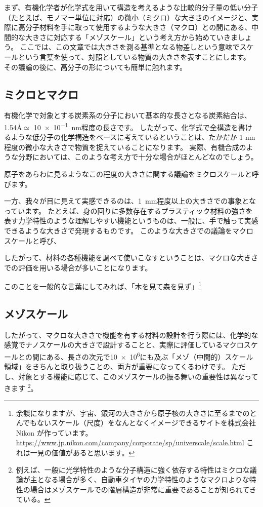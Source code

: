 \documentclass[a4paper,11pt]{ltjsarticle}
\begin{document}
まず、有機化学者が化学式を用いて構造を考えるような比較的分子量の低い分子（たとえば、モノマー単位に対応）の微小（ミクロ）な大きさのイメージと、実際に高分子材料を手に取って使用するような大きさ（マクロ）との間にある、中間的な大きさに対応する「メゾスケール」という考え方から始めていきましょう。
ここでは、この文章では大きさを測る基準となる物差しという意味でスケールという言葉を使って、対照としている物質の大きさを表すことにします。
その議論の後に、高分子の形についても簡単に触れます。

\subsection{ミクロとマクロ}

有機化学で対象とする炭素系の分子において基本的な長さとなる炭素結合は、1.54\AA $\simeq$ \qty{10e-1}{\nano\meter}程度の長さです。
したがって、化学式で全構造を書けるような低分子の化学構造をベースに考えているということは、たかだか 1 nm 程度の微小な大きさで物質を捉えていることになります。
実際、有機合成のような分野においては、このような考え方で十分な場合がほとんどなのでしょう。

原子をあらわに見るようなこの程度の大きさに関する議論をミクロスケールと呼びます。

一方、我々が目に見えて実感できるのは、\qty{1}{\mm}程度以上の大きさでの事象となっています。
たとえば、身の回りに多数存在するプラスティック材料の強さを表す力学特性のような理解しやすい機能というものは、一般に、手で触って実感できるような大きさで発現するものです。
このような大きさでの議論をマクロスケールと呼び、

したがって、材料の各種機能を調べて使いこなすということは、マクロな大きさでの評価を用いる場合が多いことになります。

このことを一般的な言葉にしてみれば、「木を見て森を見ず」\footnote{余談になりますが、宇宙、銀河の大きさから原子核の大きさに至るまでのとんでもないスケール（尺度）をなんとなくイメージできるサイトを株式会社 Nikon が作っています。
	\url{https://www.jp.nikon.com/company/corporate/sp/universcale/scale.html}
	これは一見の価値があると思います。
}

\subsection{メゾスケール}

したがって、マクロな大きさで機能を有する材料の設計を行う際には、化学的な感覚でナノスケールの大きさで設計することと、実際に評価しているマクロスケールとの間にある、長さの次元で\num{10e6}にも及ぶ「メゾ（中間的）スケール領域」をきちんと取り扱うことの、両方が重要になってくるわけです。
ただし、対象とする機能に応じて、このメゾスケールの振る舞いの重要性は異なってきます
\footnote
{
例えば、一般に光学特性のような分子構造に強く依存する特性はミクロな議論が主となる場合が多く、自動車タイヤの力学特性のようなマクロよりな特性の場合はメゾスケールでの階層構造が非常に重要であることが知られてきている。
}。
\end{document}
